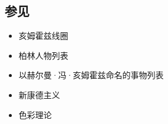 \subsection{参见}
\begin{itemize}
\item 亥姆霍兹线圈
\item 柏林人物列表
\item 以赫尔曼·冯·亥姆霍兹命名的事物列表
\item 新康德主义
\item 色彩理论
\end{itemize}